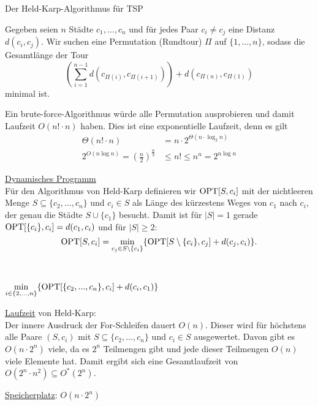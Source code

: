 \begin{section}{Der Held-Karp-Algorithmus für TSP}

  Gegeben seien \(n\) Städte \(c_1, ..., c_n\) und für jedes Paar \(c_i \neq c_j\) eine Distanz \(d(c_i,c_j)\). Wir suchen eine Permutation (Rundtour) \(\Pi\) auf \(\{1,...,n\}\), sodass die Gesamtlänge der Tour 
  \[\left( \sum_{i=1}^{n-1} d(c_{\Pi(i)},c_{\Pi(i+1)}) \right) + d(c_{\Pi(n)},c_{\Pi(1)})\] 
  minimal ist.

  Ein brute-force-Algorithmus würde alle Permutation ausprobieren und damit Laufzeit \(O(n! \cdot n)\) haben. Dies ist eine exponentielle Laufzeit, denn es gilt
  \begin{align*}
    \Theta(n!\cdot n) &= n\cdot 2^{\Theta(n \cdot \log_2 n)}\\
    2^{O(n \log n)} = (\frac{n}{2})^{\frac{n}{2}} &\leq n! \leq n^n = 2^{n\log n}
  \end{align*}
  
  \underline{Dynamisches Programm}\\
  Für den Algorithmus von Held-Karp definieren wir \(\text{OPT}[S,c_i]\) mit der nichtleeren Menge \(S \subseteq \{ c_2, ..., c_n \}\) und \(c_i \in S\) als Länge des kürzestens Weges von \(c_1\) nach \(c_i\), der genau die Städte \(S \cup \{ c_1 \}\) besucht. Damit ist für $|S| = 1$ gerade \(\text{OPT}[\{c_i\},c_i] = d(c_1,c_i)\) und für $|S| \geq 2$:
  \[\text{OPT}[S,c_i] = \min_{c_j \in S \setminus \{c_i\}} \{ \text{OPT}[S \setminus \{ c_i \}, c_j ] + d(c_j,c_i)\}.\]

  \begin{algorithm}[H]
    \caption{Algorithmus von Held-Karp zum Lösen von TSP}

     \\



    \Return \(\displaystyle \min_{i \in \{2,...,n\}} \{ \text{OPT}[\{c_2,...,c_n\},c_i] + d(c_i,c_1) \}\)
  \end{algorithm}

  \underline{Laufzeit} von Held-Karp:\\
  Der innere Ausdruck der For-Schleifen dauert $O(n)$. Dieser wird für höchstens alle Paare $(S,c_i)$ mit $S \subseteq \{c_2, \dots, c_n\}$ und $c_i \in S$ ausgewertet. Davon gibt es $O(n \cdot 2^n)$ viele, da es $2^n$ Teilmengen gibt und jede dieser Teilmengen $O(n)$ viele Elemente hat. Damit ergibt sich eine Gesamtlaufzeit von $O(2^n \cdot n^2) \subseteq O^*(2^n)$.
  
  \underline{Speicherplatz}: $O(n\cdot 2^n)$
\end{section}

